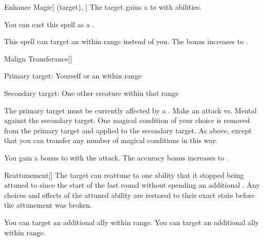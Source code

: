 \lowercase{\hypertarget{spell:Enhance Magic}{}}\label{spell:Enhance Magic}
\begin{attuneability}[Rank 3]{\hypertarget{spell:Enhance Magic}{Enhance Magic}}[ (target), ]
The target gains a   to  with  abilities.

You can cast this spell as a .

\rankline
{} This spell can target an  within \rngmed range instead of you.
 The bonus increases to .

\end{attuneability}
\vspace{0.25em}



\lowercase{\hypertarget{spell:Malign Transferance}{}}\label{spell:Malign Transferance}
\begin{freeability}[Rank 3]{\hypertarget{spell:Malign Transferance}{Malign Transferance}}[]

Primary target: Yourself or an  within \rngmed range
\par\noindent
Secondary target: One other creature within that range

The primary target must be currently affected by a  .
Make an attack vs. Mental against the secondary target.
\hit One magical condition of your choice is removed from the primary target and applied to the secondary target.
\crit As above, except that you can transfer any number of magical conditions in this way.

\rankline
{} You gain a  bonus to  with the attack.
 The accuracy bonus increases to .

\end{freeability}
\vspace{0.25em}



\lowercase{\hypertarget{spell:Reattunement}{}}\label{spell:Reattunement}
\begin{freeability}[Rank 3]{\hypertarget{spell:Reattunement}{Reattunement}}[]
The target can reattune to one ability that it stopped being attuned to since the start of the last round without spending an additional .
Any choices and effects of the attuned ability are restored to their exact state before the attunement was broken.

\rankline
{} You can target an additional ally within range.
 You can target an additional ally within range.

\end{freeability}
\vspace{0.25em}



